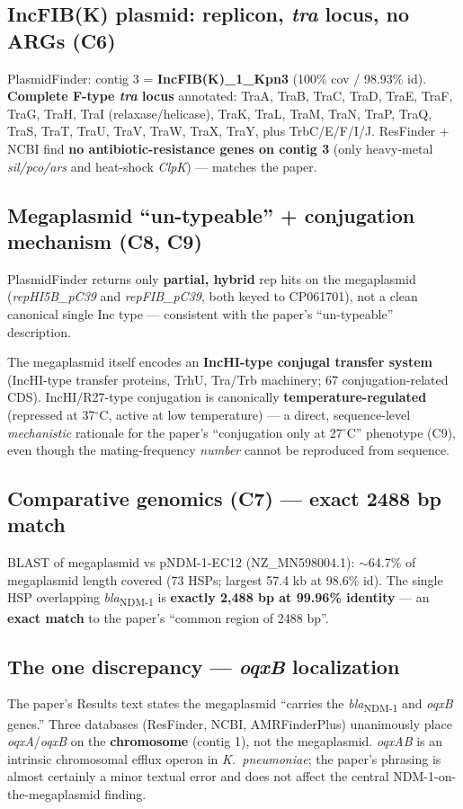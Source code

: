 \documentclass[11pt]{article}
\begin{document}
\subsection{IncFIB(K) plasmid: replicon, \emph{tra} locus, no ARGs (C6)}
PlasmidFinder: contig 3 = \textbf{IncFIB(K)\_1\_Kpn3}
(100\% cov / 98.93\% id). \textbf{Complete F-type \emph{tra} locus}
annotated: TraA, TraB, TraC, TraD, TraE, TraF, TraG, TraH,
TraI (relaxase/helicase), TraK, TraL, TraM, TraN, TraP, TraQ, TraS, TraT,
TraU, TraV, TraW, TraX, TraY, plus TrbC/E/F/I/J.
ResFinder + NCBI find \textbf{no antibiotic-resistance genes on contig 3}
(only heavy-metal \emph{sil/pco/ars} and heat-shock \emph{ClpK}) ---
matches the paper.

\subsection{Megaplasmid ``un-typeable'' + conjugation mechanism (C8, C9)}
PlasmidFinder returns only \textbf{partial, hybrid} rep hits on the
megaplasmid (\emph{repHI5B\_pC39} and \emph{repFIB\_pC39}, both keyed to
CP061701), not a clean canonical single Inc type --- consistent with the
paper's ``un-typeable'' description.

The megaplasmid itself encodes an \textbf{IncHI-type conjugal transfer
system} (IncHI-type transfer proteins, TrhU, Tra/Trb machinery; 67
conjugation-related CDS). IncHI/R27-type conjugation is
canonically \textbf{temperature-regulated} (repressed at 37$^\circ$C,
active at low temperature) --- a direct, sequence-level \emph{mechanistic}
rationale for the paper's ``conjugation only at 27$^\circ$C''
phenotype (C9), even though the mating-frequency \emph{number} cannot be
reproduced from sequence.

\subsection{Comparative genomics (C7) --- exact 2488 bp match}
BLAST of megaplasmid vs pNDM-1-EC12 (NZ\_MN598004.1):
$\sim$64.7\% of megaplasmid length covered (73 HSPs; largest 57.4 kb at
98.6\% id). The single HSP overlapping \emph{bla}\textsubscript{NDM-1} is
\textbf{exactly 2{,}488 bp at 99.96\% identity} --- an \textbf{exact match}
to the paper's ``common region of 2488 bp''.

\subsection{The one discrepancy --- \emph{oqxB} localization}
The paper's Results text states the megaplasmid ``carries the
\emph{bla}\textsubscript{NDM-1} and \emph{oqxB} genes.''
Three databases (ResFinder, NCBI, AMRFinderPlus) unanimously place
\emph{oqxA}/\emph{oqxB} on the \textbf{chromosome} (contig 1),
not the megaplasmid. \emph{oqxAB} is an intrinsic chromosomal efflux
operon in \emph{K.\ pneumoniae}; the paper's phrasing is almost certainly
a minor textual error and does not affect the central
NDM-1-on-the-megaplasmid finding.
\end{document}
